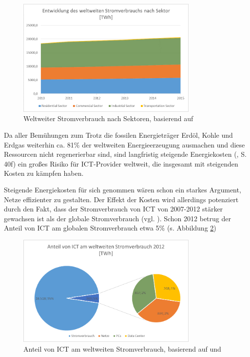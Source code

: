 \documentclass[12pt,titlepage]{article}
\begin{document}
\begin{figure}[!ht]
	\centering
	\includegraphics[width=0.8\textwidth]{ProbStromSektor}
	\caption{Weltweiter Stromverbrauch nach Sektoren, basierend auf \cite{bibid}}
	\label{fig:ProbStromSektor}
\end{figure}
Da aller Bemühungen zum Trotz die fossilen Energieträger Erdöl, Kohle und Erdgas weiterhin ca. 81\% der weltweiten Energieerzeugung ausmachen \cite{statista} und diese Ressourcen nicht regenerierbar sind, sind langfristig steigende Energiekosten (\cite{iea2015}, S. 40f) ein großes Risiko für ICT-Provider weltweit, die insgesamt mit steigenden Kosten zu kämpfen haben.

Steigende Energiekosten für sich genommen wären schon ein starkes Argument, Netze effizienter zu gestalten.  Der Effekt der Kosten wird allerdings potenziert durch den Fakt, dass der Stromverbrauch von ICT von 2007-2012 stärker gewachsen ist als der globale Stromverbrauch (vgl. \cite[9]{vanhedde}). Schon 2012 betrug der Anteil von ICT am globalen Stromverbrauch etwa 5\% (s. Abbildung \ref{fig:ProbStromICT}) 

\begin{figure}[!ht]
	\centering
	\includegraphics[width=0.8\textwidth]{ProbStromICT}
	\caption{Anteil von ICT am weltweiten Stromverbrauch, basierend auf \cite{bibid} und \cite{bibid}}
	\label{fig:ProbStromICT}
\end{figure}
\end{document}
